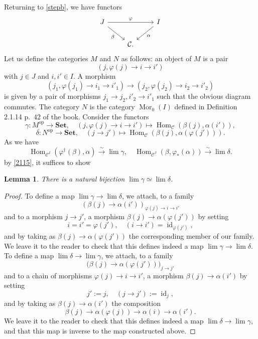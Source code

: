 \documentclass[12pt]{article}%
\newtheorem{lem}[thm]{Lemma}
\theoremstyle{remark}
\theoremstyle{definition}
\newcommand{\C}{\mathcal C}
\newcommand{\Set}{\mathbf{Set}}
\newcommand{\xr}{\xrightarrow}
\DeclareMathOperator{\id}{id}
\DeclareMathOperator{\Hom}{Hom}%
\DeclareMathOperator{\Mor}{Mor}
\DeclareMathOperator{\op}{op}
\begin{document}
Returning to \eqref{stepb}, we have functors 
$$
\begin{tikzcd}
J\ar{rr}{\varphi}\ar{dr}[swap]{\beta}&&I\ar{dl}{\alpha}\\ 
&\C.
\end{tikzcd}
$$ 
Let us define the categories $M$ and $N$ as follows: an object of $M$ is a pair 
$$
(j,\varphi(j)\to i\to i')
$$ 
with $j\in J$ and $i,i'\in I$. A morphism 
$$
(j_1,\varphi(j_1)\to i_1\to i'_1)\to(j_2,\varphi(j_2)\to i_2\to i'_2)
$$ 
is given by a pair of morphisms $j_1\to j_2,i'_2\to i'_1$ such that the obvious diagram commutes. The category $N$ is the category $\Mor_0(I)$ defined in Definition 2.1.14 p.~42 of the book. Consider the functors 
$$
\gamma:M^{\op}\to\Set,\quad(j,\varphi(j)\to i\to i')\mapsto\Hom_\C(\beta(j),\alpha(i')), 
$$ 
$$
\delta:N^{\op}\to\Set,\quad(j\to j')\mapsto\Hom_\C(\beta(j),\alpha(\varphi(j'))). 
$$ 
As we have 
$$
\Hom_{\C^I}(\varphi^\dagger(\beta),\alpha)\xr\sim\lim\gamma,\quad
\Hom_{\C^J}(\beta,\varphi_*(\alpha))\xr\sim\lim\delta. 
$$ 
by \eqref{2115}, it suffices to show 
%
\begin{lem}
%
There is a natural bijection $\lim\gamma\simeq\lim\delta$. 
%
\end{lem} 
%
\begin{proof}
To define a map $\lim\gamma\to\lim\delta$, we attach, to a family 
$$
(\beta(j)\to\alpha(i'))_{\varphi(j)\to i\to i'}
$$ 
and to a morphism $j\to j'$, a morphism $\beta(j)\to\alpha(\varphi(j'))$ by setting 
$$
i=i'=\varphi(j'),\quad(i\to i')=\id_{\varphi(j')},
$$ 
and by taking as $\beta(j)\to\alpha(\varphi(j'))$ the corresponding member of our family. We leave it to the reader to check that this defines indeed a map $\lim\gamma\to\lim\delta$. To define a map $\lim\delta\to\lim\gamma$, we attach, to a family 
$$
\big(\beta(j)\to\alpha(\varphi(j'))\big)_{j\to j'}
$$ 
and to a chain of morphisms $\varphi(j)\to i\to i'$, a morphism $\beta(j)\to\alpha(i')$ by setting 
$$
j':=j,\quad(j\to j'):=\id_{j},
$$ 
and by taking as $\beta(j)\to\alpha(i')$ the composition 
$$
\beta(j)\to\alpha(\varphi(j))\to\alpha(i)\to\alpha(i'). 
$$ 
We leave it to the reader to check that this defines indeed a map $\lim\delta\to\lim\gamma$, and that this map is inverse to the map constructed above.
\end{proof}
%
\end{document}
